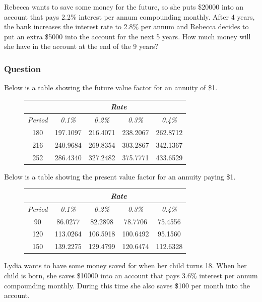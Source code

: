 \documentclass[a4paper,12pt]{article}
\newcounter{QCounter}
\def\qcnt{\stepcounter{QCounter}\arabic{QCounter}}
\begin{document}
Rebecca wants to save some money for the future, so she puts 
\$20000 into an account that pays 2.2\% interest per annum 
compounding monthly. After 4 years, the bank increases the 
interest rate to 2.8\% per annum and Rebecca decides to put 
an extra \$5000 into the account for the next 5 years. How 
much money will she have in the account at the end of 
the 9 years?

\subsubsection*{Question \qcnt}

Below is a table showing the future value factor for an 
annuity of \$1.

\begin{figure}[h]
\centering
\begin{tabular}{|c|c|c|c|c|}
\hline
& \multicolumn{4}{c|}{\emph{Rate}} \\
\hline
\emph{Period} & \emph{0.1\%} & \emph{0.2\%} & \emph{0.3\%} & \emph{0.4\%} \\
\hline
180 & 197.1097 & 216.4071 & 238.2067 & 262.8712 \\
\hline
216 & 240.9684 & 269.8354 & 303.2867 & 342.1367 \\
\hline
252 & 286.4340 & 327.2482 & 375.7771 & 433.6529 \\
\hline
\end{tabular}
\end{figure}

Below is a table showing the present value factor for an 
annuity paying \$1.

\begin{figure}[h]
\centering
\begin{tabular}{|c|c|c|c|c|}
\hline
& \multicolumn{4}{c|}{\emph{Rate}} \\
\hline
\emph{Period} & \emph{0.1\%} & \emph{0.2\%} & \emph{0.3\%} & \emph{0.4\%} \\
\hline
90 & 86.0277 & 82.2898 & 78.7706 & 75.4556 \\
\hline
120 & 113.0264 & 106.5918 & 100.6492 & 95.1560 \\
\hline
150 & 139.2275 & 129.4799 & 120.6474 & 112.6328 \\
\hline
\end{tabular}
\end{figure}

Lydia wants to have some money saved for when her child turns 18. 
When her child is born, she saves \$10000 into an account that pays 
3.6\% interest per annum compounding monthly. During this time she 
also saves \$100 per month into the account.
\end{document}
